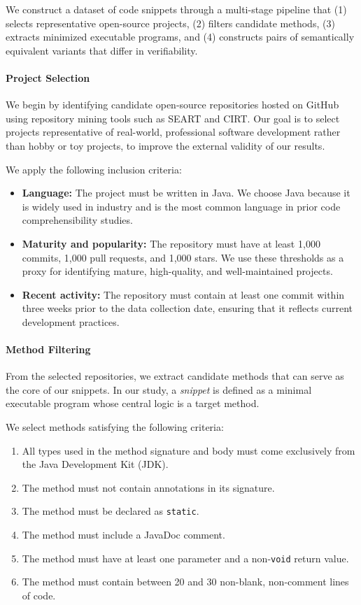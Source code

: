 We construct a dataset of code snippets through a multi-stage pipeline that (1) selects representative open-source projects, (2) filters candidate methods, (3) extracts minimized executable programs, and (4) constructs pairs of semantically equivalent variants that differ in verifiability.

\paragraph{Project Selection}
We begin by identifying candidate open-source repositories hosted on GitHub using repository mining tools such as SEART and CIRT. Our goal is to select projects representative of real-world, professional software development rather than hobby or toy projects, to improve the external validity of our results.

We apply the following inclusion criteria:
\begin{itemize}
    \item \textbf{Language:} The project must be written in Java. We choose Java because it is widely used in industry and is the most common language in prior code comprehensibility studies.
    \item \textbf{Maturity and popularity:} The repository must have at least 1{,}000 commits, 1{,}000 pull requests, and 1{,}000 stars. We use these thresholds as a proxy for identifying mature, high-quality, and well-maintained projects.
    \item \textbf{Recent activity:} The repository must contain at least one commit within three weeks prior to the data collection date, ensuring that it reflects current development practices.
\end{itemize}

\paragraph{Method Filtering}
From the selected repositories, we extract candidate methods that can serve as the core of our snippets. In our study, a \emph{snippet} is defined as a minimal executable program whose central logic is a target method.

We select methods satisfying the following criteria:
\begin{enumerate}
    \item All types used in the method signature and body must come exclusively from the Java Development Kit (JDK).
    \item The method must not contain annotations in its signature.
    \item The method must be declared as \texttt{static}.
    \item The method must include a JavaDoc comment.
    \item The method must have at least one parameter and a non-\texttt{void} return value.
    \item The method must contain between 20 and 30 non-blank, non-comment lines of code.
\end{enumerate}

